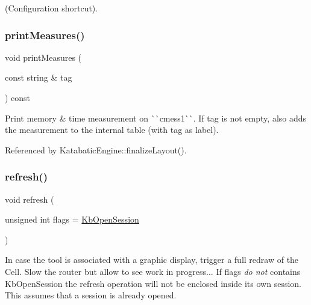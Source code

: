 (Configuration shortcut). \mbox{\label{classKatabatic_1_1KatabaticEngine_a2ea4b4fc379fb85a13890db451cbf93a}} 
\subsubsection{\texorpdfstring{print\+Measures()}{printMeasures()}}
{\footnotesize\ttfamily void print\+Measures (\begin{DoxyParamCaption}\item[{const string \&}]{tag }\end{DoxyParamCaption}) const}

Print memory \& time measurement on \`{}\`{}cmess1\`{}\`{}. If {\ttfamily tag} is not empty, also adds the measurement to the internal table (with {\ttfamily tag} as label). 

Referenced by Katabatic\+Engine\+::finalize\+Layout().

\mbox{\label{classKatabatic_1_1KatabaticEngine_a1e9bb62be35c6a415a1950c72c1964ef}} 
\subsubsection{\texorpdfstring{refresh()}{refresh()}}
{\footnotesize\ttfamily void refresh (\begin{DoxyParamCaption}\item[{unsigned int}]{flags = {\ttfamily \mbox{\hyperlink{namespaceKatabatic_a2af2ad6b6441614038caf59d04b3b217af314588109fcc5f5ee1c42e5fd4d0ed5}{Kb\+Open\+Session}}} }\end{DoxyParamCaption})}

In case the tool is associated with a graphic display, trigger a full redraw of the Cell. Slow the router but allow to see work in progress... If {\ttfamily flags} {\itshape do not} contains {\ttfamily Kb\+Open\+Session} the refresh operation will not be enclosed inside it\textquotesingle{}s own session. This assumes that a session is already opened. 

